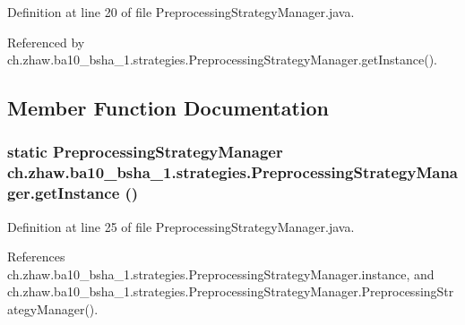 Definition at line 20 of file PreprocessingStrategyManager.java.

Referenced by ch.zhaw.ba10\_\-bsha\_\-1.strategies.PreprocessingStrategyManager.getInstance().

\subsection{Member Function Documentation}
\hypertarget{classch_1_1zhaw_1_1ba10__bsha__1_1_1strategies_1_1PreprocessingStrategyManager_a735eb5e52177dd2ce40e0f4046682e8b}{
\subsubsection[{getInstance}]{\setlength{\rightskip}{0pt plus 5cm}static {\bf PreprocessingStrategyManager} ch.zhaw.ba10\_\-bsha\_\-1.strategies.PreprocessingStrategyManager.getInstance ()}}
\label{classch_1_1zhaw_1_1ba10__bsha__1_1_1strategies_1_1PreprocessingStrategyManager_a735eb5e52177dd2ce40e0f4046682e8b}


Definition at line 25 of file PreprocessingStrategyManager.java.

References ch.zhaw.ba10\_\-bsha\_\-1.strategies.PreprocessingStrategyManager.instance, and ch.zhaw.ba10\_\-bsha\_\-1.strategies.PreprocessingStrategyManager.PreprocessingStrategyManager().


